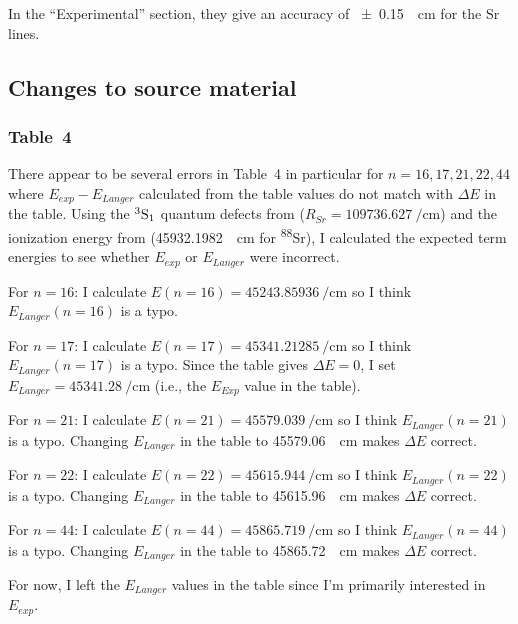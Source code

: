 \documentclass{article}
\newcommand{\tsup}{\textsuperscript}													%
\newcommand{\tsub}{\textsubscript}														%
\newcommand{\Sr}[1]{\tsup{#1}\textnormal{Sr}}											%
\newcommand{\SLJ}[3]{\tsup{#1}\textnormal{#2}\tsub{#3}}
\begin{document}
\section{}

In the ``Experimental'' section, they give an accuracy of \SI{\pm0.15}{\per\cm} for the Sr lines. 

\subsection{Changes to source material}

\subsubsection{Table~4}

There appear to be several errors in Table~4 in particular for ${n=16, 17, 21, 22, 44}$ where ${E_{exp} - E_{Langer}}$ calculated from the table values do not match with ${\Delta E}$ in the table. Using the $\SLJ{3}{S}{1}$ quantum defects from \cite{vjp_2012} (${R_{Sr} = \SI{109736.627}{\per\cm}}$) and the ionization energy from \cite{san_2010} (\SI{45932.1982}{\per\cm} for \Sr{88}), I calculated the expected term energies to see whether $E_{exp}$ or $E_{Langer}$ were incorrect. 

For ${n=16}$: I calculate ${E(n=16) = \SI{45243.85936}{\per\cm}}$ so I think ${E_{Langer}(n=16)}$ is a typo.

For ${n=17}$: I calculate ${E(n=17) = \SI{45341.21285}{\per\cm}}$ so I think ${E_{Langer}(n=17)}$ is a typo. Since the table gives ${\Delta E = 0}$, I set ${E_{Langer} = \SI{45341.28}{\per\cm}}$ (i.e., the $E_{Exp}$ value in the table).

For ${n=21}$: I calculate ${E(n=21) = \SI{45579.039}{\per\cm}}$ so I think ${E_{Langer}(n=21)}$ is a typo. Changing $E_{Langer}$ in the table to \SI{45579.06}{\per\cm} makes ${\Delta E}$ correct.

For ${n=22}$: I calculate ${E(n=22) = \SI{45615.944}{\per\cm}}$ so I think ${E_{Langer}(n=22)}$ is a typo. Changing $E_{Langer}$ in the table to \SI{45615.96}{\per\cm} makes ${\Delta E}$ correct.

For ${n=44}$: I calculate ${E(n=44) = \SI{45865.719}{\per\cm}}$ so I think ${E_{Langer}(n=44)}$ is a typo. Changing $E_{Langer}$ in the table to \SI{45865.72}{\per\cm} makes ${\Delta E}$ correct.

For now, I left the $E_{Langer}$ values in the table since I'm primarily interested in $E_{exp}$.
\end{document}
